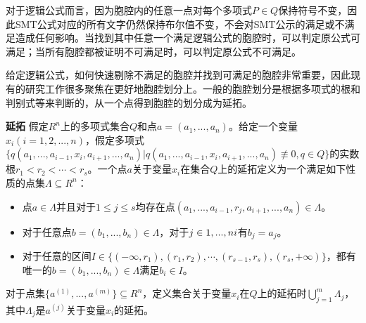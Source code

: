 对于逻辑公式而言，因为胞腔内的任意一点对每个多项式$P \in Q$保持符号不变，因此SMT公式对应的所有文字仍然保持布尔值不变，不会对SMT公示的满足或不满足造成任何影响。当找到其中任意一个满足逻辑公式的胞腔时，可以判定原公式可满足；当所有胞腔都被证明不可满足时，可以判定原公式不可满足。

给定逻辑公式，如何快速剔除不满足的胞腔并找到可满足的胞腔非常重要，因此现有的研究工作很多聚焦在更好地胞腔划分上。一般的胞腔划分是根据多项式的根和判别式等来判断的，从一个点得到胞腔的划分成为延拓。
\begin{definition}{\textbf{延拓}}
假定$R^n$上的多项式集合$Q$和点$a = (a_1, ..., a_n)$。给定一个变量$x_i (i = 1, 2,..., n)$，假定多项式$
\{q(a_1, ..., a_{i-1}, x_i, a_{i+1}, ..., a_n) | q(a_1, ..., a_{i-1}, x_i, a_{i+1}, ..., a_n) \nequiv 0, q \in Q\}$的实数根$r_1 < r_2 < \cdots < r_s$。一个点$a$关于变量$x_i$在集合$Q$上的延拓定义为一个满足如下性质的点集$\Lambda \subseteq R^n$：
\begin{itemize}
    \item 点$a \in \Lambda$并且对于$1 \leq j \leq s$均存在点$(a_1, ..., a_{i-1}, r_j, a_{i+1}, ..., a_n) \in \Lambda$。
    \item 对于任意点$b = (b_1, ..., b_n) \in \Lambda$，对于$j \in {1, ..., n} \\ {i}$有$b_j = a_j$。
    \item 对于任意的区间$I \in \{(-\infty, r_1), (r_1, r_2), \cdots, (r_{s-1}, r_s), (r_s, +\infty)\}$，都有唯一的$b = (b_1, ..., b_n) \in \Lambda$满足$b_i \in I$。
\end{itemize}
对于点集$\{a^{(1)}, ..., a^{(m)}\} \subseteq R^n$，定义集合关于变量$x_i$在$Q$上的延拓时$\bigcup_{j=1}^m \Lambda_j$，其中$\Lambda_j$是$a^{(j)}$关于变量$x_i$的延拓。
\end{definition}

